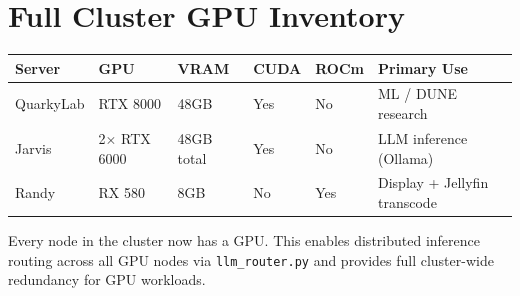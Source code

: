\documentclass[11pt, letterpaper]{article}
\begin{document}
\section{Full Cluster GPU Inventory}

\begin{tabularx}{\textwidth}{lllllX}
\toprule
\textbf{Server} & \textbf{GPU} & \textbf{VRAM} & \textbf{CUDA} & \textbf{ROCm} & \textbf{Primary Use} \\
\midrule
QuarkyLab & RTX 8000      & 48GB       & Yes & No  & ML / DUNE research \\
Jarvis    & 2$\times$ RTX 6000 & 48GB total & Yes & No  & LLM inference (Ollama) \\
Randy     & RX 580        & 8GB        & No  & Yes & Display + Jellyfin transcode \\
\bottomrule
\end{tabularx}

Every node in the cluster now has a GPU. This enables distributed inference routing across all GPU nodes via \texttt{llm\_router.py} and provides full cluster-wide redundancy for GPU workloads.
\end{document}
